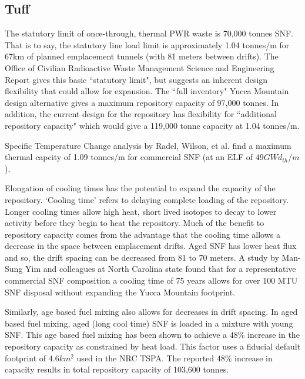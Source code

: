 \subsection{Tuff}





The statutory limit of once-through, thermal PWR waste is 70,000 tonnes SNF.
That is to say, the statutory line load limit is approximately 1.04 tonnes/m
for 67km of planned emplacement tunnels (with 81 meters between drifts). The
Office of Civilian Radioactive Waste Management Science and Engineering Report
gives this basic ``statutory limit", but suggests an inherent design
flexibility that could allow for expansion. The ``full inventory" Yucca
Mountain design alternative gives a maximum repository capacity of 97,000
tonnes. In addition, the current design for the repository has flexibility for
``additional repository capacity" which would give a 119,000 tonne capacity at
1.04 tonnes/m.\cite{ doe_yucca_2002}

Specific Temperature Change analysis by Radel, Wilson, et al. find a maximum
thermal capcity of 1.09 tonnes/m for commercial SNF (at an ELF of $49
GWd_{th}/m$).\cite{radel_effect_2007} 

Elongation of cooling times has the potential to expand the capacity of the
repository. `Cooling time' refers to delaying complete loading of the
repository. Longer cooling times allow high heat, short lived isotopes to decay
to lower activity before they begin to heat the repository. Much of the benefit
to repository capacity comes from the advantage that the cooling time allows a
decrease in the space between emplacement drifts. Aged SNF has lower heat flux
and so, the drift spacing can be decreased from 81 to 70 meters. A study by
Man-Sung Yim and colleagues at North Carolina state found that for a
representative commercial SNF composition a cooling time of 75 years allows for
over 100 MTU SNF disposal without expanding the Yucca Mountain
footprint.\cite{li_examining_2007}

Similarly, age based fuel mixing also allows for decreases in drift spacing. In
aged based fuel mixing, aged (long cool time) SNF is loaded in a mixture with
young SNF. This age based fuel mixing has been shown to achieve a $48\%$
increase in the repository capacity as constrained by heat
load.\cite{nicholson_thermal_2007} This factor uses a fiducial default
footprint of $4.6 km^2$ used in the NRC TSPA.  The reported $48\%$ increase in
capacity results in total repository capacity of 103,600
tonnes.\cite{williams_contract_2001}

